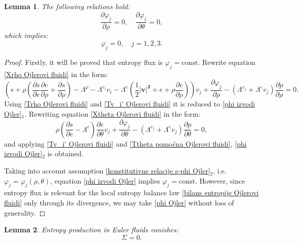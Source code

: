 \documentclass[a4paper,fleqn]{cas-sc}
\newtheorem{lemma}{Lemma}[section]
\theoremstyle{definition}
\begin{document}
\begin{lemma} \label{Lema:phi_j jednakosti Ojler}
	The following relations hold: 
	\begin{equation} \label{phi izvodi Ojler}
		\dfrac{\partial\varphi_j}{\partial\rho}=0, \quad 
		\dfrac{\partial\varphi_j}{\partial\theta} = 0, 
	\end{equation}
	which implies: 
	\begin{equation} \label{phi Ojler}
		\varphi_{j} = 0, \quad j = 1, 2, 3. 
	\end{equation}
\end{lemma}
\begin{proof}
	Firstly, it will be proved that entropy flux is $\varphi_j = \mathrm{const.}$ Rewrite equation \eqref{Xrho Ojlerovi fluidi} in the form:
	\begin{equation*}
		\left(s+\rho\left(\dfrac{\partial s}{\partial e}\dfrac{\partial e}{\partial\rho}+\dfrac{\partial s}{\partial\rho}\right)
		- \Lambda^\rho-\Lambda^{v_i}v_i -\Lambda^e \left( \dfrac{1}{2}|\mathbf{v|^2} + e + \rho\dfrac{\partial e}{\partial\rho} \right) \right) v_j %
		+\dfrac{\partial\varphi_j}{\partial\rho}
		-\left(\Lambda^{v_j}+\Lambda^ e v_j\right)\dfrac{\partial p}{\partial\rho} = 0. 
	\end{equation*}
	Using \eqref{Trho Ojlerovi fluidi} and \eqref{Tv_i' Ojlerovi fluidi} it is reduced to \eqref{phi izvodi Ojler}$_{1}$. Rewriting equation \eqref{Xtheta Ojlerovi fluidi} in the form: 
	\begin{equation*}
		\rho \left( \dfrac{\partial s}{\partial e} - \Lambda^e\right) 
		\dfrac{\partial e}{\partial\theta} v_j + \dfrac{\partial\varphi_j}{\partial\theta}-(\Lambda^{v_j}+\Lambda^ e v_j)\dfrac{\partial p}{\partial\theta}=0,
	\end{equation*}
	and applying \eqref{Tv_i' Ojlerovi fluidi} and \eqref{Ttheta pomoćna Ojlerovi fluidi}, \eqref{phi izvodi Ojler}$_{2}$ is obtained. 
	
	Taking into account assumption \eqref{konstitutivne relacije s-phi Ojler}$_{2}$, i.e. $\varphi_{j} = \varphi_{j}(\rho, \theta)$, equation \eqref{phi izvodi Ojler} implies $\varphi_{j} = \mathrm{const.}$ However, since entropy flux is relevant for the local entropy balance law \eqref{bilans entropije Ojlerovi fluidi} only through its divergence, we may take \eqref{phi Ojler} without loss of generality. 
\end{proof}

\begin{lemma} \label{Lema:produkcija entropije Ojler}
	Entropy production in Euler fluids vanishes: 
	\begin{equation} \label{Sigma Ojlerovi fluidi}
		\Sigma = 0. 
	\end{equation}
\end{lemma} 
\end{document}

